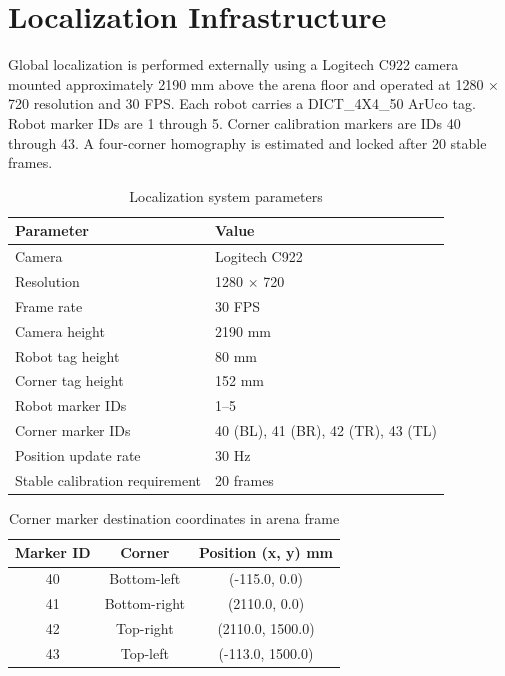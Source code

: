 \documentclass[a4paper,oneside,titlepage,11pt]{report}
\begin{document}
\section{Localization Infrastructure}
Global localization is performed externally using a Logitech C922 camera mounted approximately 2190 mm above the arena floor and operated at 1280 $\times$ 720 resolution and 30 FPS. Each robot carries a DICT\_4X4\_50 ArUco tag. Robot marker IDs are 1 through 5. Corner calibration markers are IDs 40 through 43. A four-corner homography is estimated and locked after 20 stable frames.

\begin{table}[H]
\centering
\caption{Localization system parameters}
\label{tab:localization_params}
\begin{tabular}{ll}
\toprule
\textbf{Parameter} & \textbf{Value} \\
\midrule
Camera & Logitech C922 \\
Resolution & 1280 $\times$ 720 \\
Frame rate & 30 FPS \\
Camera height & 2190 mm \\
Robot tag height & 80 mm \\
Corner tag height & 152 mm \\
Robot marker IDs & 1--5 \\
Corner marker IDs & 40 (BL), 41 (BR), 42 (TR), 43 (TL) \\
Position update rate & 30 Hz \\
Stable calibration requirement & 20 frames \\
\bottomrule
\end{tabular}
\end{table}

\begin{table}[H]
\centering
\caption{Corner marker destination coordinates in arena frame}
\label{tab:corner_coords}
\begin{tabular}{ccc}
\toprule
\textbf{Marker ID} & \textbf{Corner} & \textbf{Position (x, y) mm} \\
\midrule
40 & Bottom-left & (-115.0, 0.0) \\
41 & Bottom-right & (2110.0, 0.0) \\
42 & Top-right & (2110.0, 1500.0) \\
43 & Top-left & (-113.0, 1500.0) \\
\bottomrule
\end{tabular}
\end{table}
\end{document}
